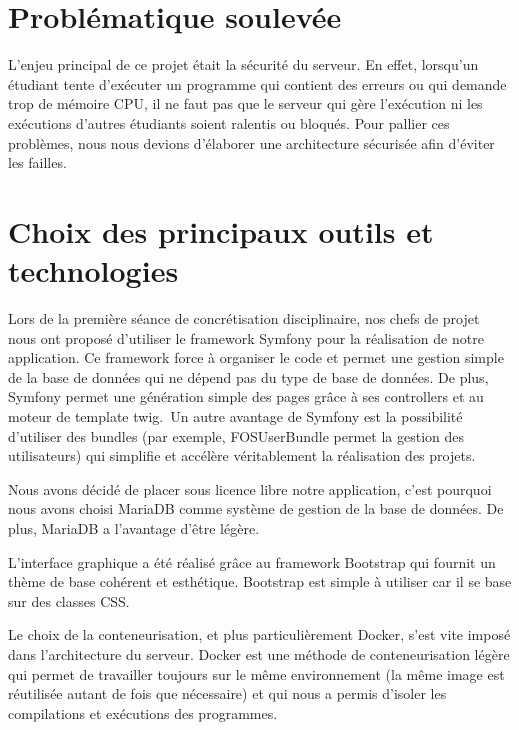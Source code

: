 \section{Problématique soulevée}

\par L'enjeu principal de ce projet était la sécurité du serveur. En effet, lorsqu'un étudiant tente d'exécuter un programme qui contient des erreurs ou qui demande trop de mémoire CPU, il ne faut pas que le serveur qui gère l'exécution ni les exécutions d'autres étudiants soient ralentis ou bloqués. Pour pallier ces problèmes, nous nous devions d'élaborer une architecture sécurisée afin d'éviter les failles.


\section{Choix des principaux outils et technologies}
\label{sec-principaux-outils}
\par Lors de la première séance de concrétisation disciplinaire, nos chefs de projet nous ont proposé d'utiliser le framework Symfony pour la réalisation de notre application. Ce framework force à organiser le code et permet une gestion simple de la base de données qui ne dépend pas du type de base de données. De plus, Symfony permet une génération simple des pages grâce à ses controllers et au moteur de template twig.\
Un autre avantage de Symfony est la possibilité d'utiliser des bundles (par exemple, FOSUserBundle permet la gestion des utilisateurs) qui simplifie et accélère véritablement la réalisation des projets. \\

\par Nous avons décidé de placer sous licence libre notre application, c'est pourquoi nous avons choisi MariaDB comme système de gestion de la base de données. De plus, MariaDB a l'avantage d'être légère. \\

\par L'interface graphique a été réalisé grâce au framework Bootstrap qui fournit un thème de base cohérent et esthétique. Bootstrap est simple à utiliser car il se base sur des classes CSS. \\

\par Le choix de la conteneurisation, et plus particulièrement Docker, s'est vite imposé dans l'architecture du serveur. Docker est une méthode de conteneurisation légère qui permet de travailler toujours sur le même environnement (la même image est réutilisée autant de fois que nécessaire) et qui nous a permis d'isoler les compilations et exécutions des programmes.

